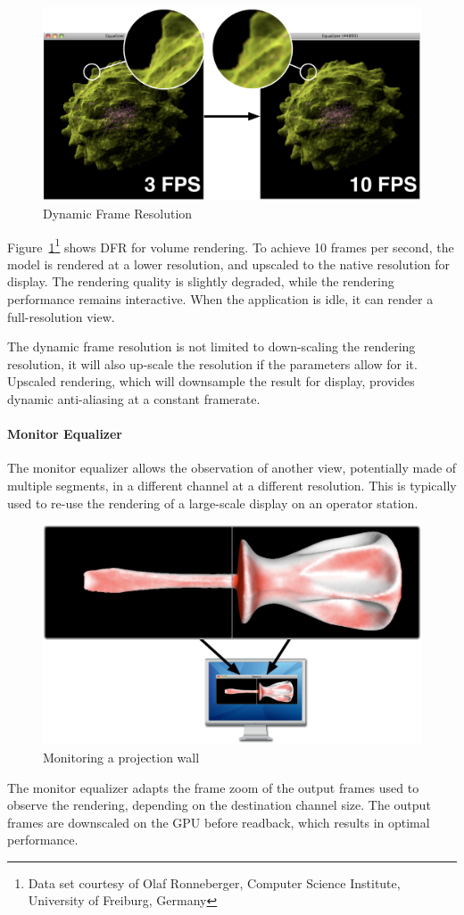 \documentclass[10pt,a4]{scrartcl}
\newcommand{\fig}[1]{Figure~\ref{#1}}
\begin{document}
\begin{figure}
  \includegraphics[width=.618\textwidth]{images/dfr.pdf}
  {\caption{\label{fDFR}\small Dynamic Frame Resolution}}
\end{figure}
\fig{fDFR}\footnote{Data set courtesy of Olaf Ronneberger, Computer
  Science Institute, University of Freiburg, Germany} shows DFR for
volume rendering. To achieve 10 frames per second, the model is rendered
at a lower resolution, and upscaled to the native resolution for
display. The rendering quality is slightly degraded, while the rendering
performance remains interactive. When the application is idle, it can
render a full-resolution view.

The dynamic frame resolution is not limited to down-scaling the
rendering resolution, it will also up-scale the resolution if the
parameters allow for it. Upscaled rendering, which will downsample the
result for display, provides dynamic anti-aliasing at a constant
framerate.

\paragraph{Monitor Equalizer}
The monitor equalizer allows the observation of another view,
potentially made of multiple segments, in a different channel at a
different resolution. This is typically used to re-use the rendering of
a large-scale display on an operator station.

\begin{figure}
  \includegraphics[width=.618\textwidth]{images/monitorEq.pdf}
  {\caption{\label{fMonitorEq}\small Monitoring a projection wall}}
\end{figure}
The monitor equalizer adapts the frame zoom of the output frames used to
observe the rendering, depending on the destination channel size. The
output frames are downscaled on the GPU before readback, which results
in optimal performance.
\end{document}
